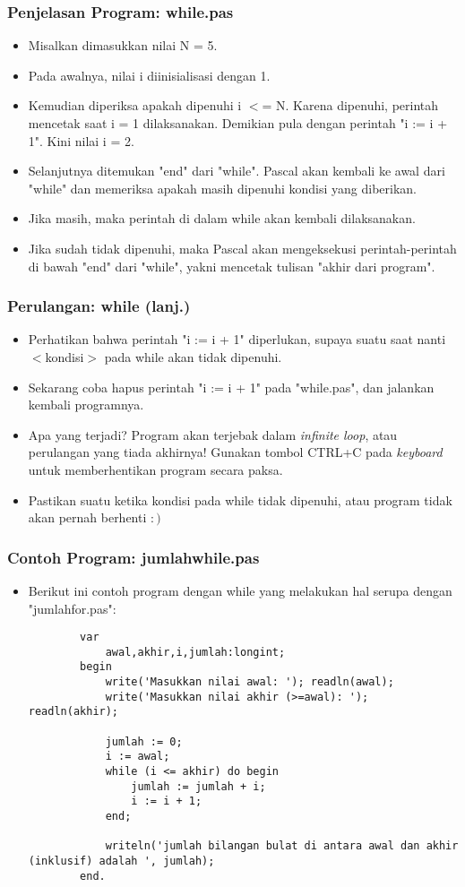 \documentclass{beamer}
\begin{document}
\begin{frame}
\frametitle{Penjelasan Program: while.pas}
\begin{itemize}
	\item Misalkan dimasukkan nilai N = 5.
	\item Pada awalnya, nilai i diinisialisasi dengan 1.
	\item Kemudian diperiksa apakah dipenuhi i $<$= N. Karena dipenuhi, perintah mencetak saat i = 1 dilaksanakan. Demikian pula dengan perintah "i := i + 1". Kini nilai i = 2.
	\item Selanjutnya ditemukan "end" dari "while". Pascal akan kembali ke awal dari "while" dan memeriksa apakah masih dipenuhi kondisi yang diberikan.
	\item Jika masih, maka perintah di dalam while akan kembali dilaksanakan.
	\item Jika sudah tidak dipenuhi, maka Pascal akan mengeksekusi perintah-perintah di bawah "end" dari "while", yakni mencetak tulisan "akhir dari program".
\end{itemize}
\end{frame}

\begin{frame}
\frametitle{Perulangan: while (lanj.)}
\begin{itemize}
	\item Perhatikan bahwa perintah "i := i + 1" diperlukan, supaya suatu saat nanti $<$kondisi$>$ pada while akan tidak dipenuhi.
	\item Sekarang coba hapus perintah "i := i + 1" pada "while.pas", dan jalankan kembali programnya.
	\item Apa yang terjadi? Program akan terjebak dalam \alert{\textit{infinite loop}}, atau \alert{perulangan yang tiada akhirnya}! Gunakan tombol CTRL+C pada \textit{keyboard} untuk memberhentikan program secara paksa.
	\item Pastikan suatu ketika kondisi pada while tidak dipenuhi, atau program tidak akan pernah berhenti $:)$
\end{itemize}
\end{frame}

\begin{frame}[fragile]
\frametitle{Contoh Program: jumlahwhile.pas}
\begin{itemize}
	\item Berikut ini contoh program dengan while yang melakukan hal serupa dengan "jumlahfor.pas":
	\begin{lstlisting}
		var
		    awal,akhir,i,jumlah:longint;
		begin
		    write('Masukkan nilai awal: '); readln(awal);
		    write('Masukkan nilai akhir (>=awal): '); readln(akhir);
		
		    jumlah := 0;
		    i := awal;
		    while (i <= akhir) do begin
		        jumlah := jumlah + i;
		        i := i + 1;
		    end;
		
		    writeln('jumlah bilangan bulat di antara awal dan akhir (inklusif) adalah ', jumlah);
		end.
	\end{lstlisting}
\end{itemize}
\end{frame}
\end{document}
